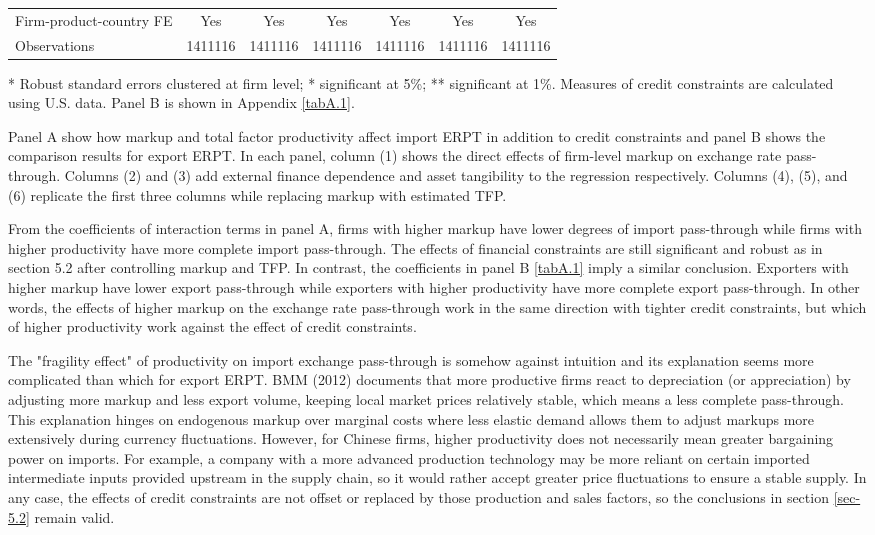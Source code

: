 \begin{table}[htbp]
\begin{threeparttable}
\begin{tabular}{lcccccc}
		Firm-product-country FE & Yes   & Yes   & Yes   & Yes   & Yes   & Yes \\
		Observations & 1411116 & 1411116 & 1411116 & 1411116 & 1411116 & 1411116 \\
		\bottomrule
	\end{tabular}
	\begin{tablenotes}
		\footnotesize
		\item[*] Robust standard errors clustered at firm level; * significant at 5\%; ** significant at 1\%. Measures of credit constraints are calculated using U.S. data. Panel B is shown in Appendix \ref{tabA.1}.
	\end{tablenotes}
	\end{threeparttable}
	\label{tab5.3}
\end{table}

Panel A show how markup and total factor productivity affect import ERPT in addition to credit constraints and panel B shows the comparison results for export ERPT. In each panel, column (1) shows the direct effects of firm-level markup on exchange rate pass-through. Columns (2) and (3) add external finance dependence and asset tangibility to the regression respectively. Columns (4), (5), and (6) replicate the first three columns while replacing markup with estimated TFP. 

From the coefficients of interaction terms in panel A, firms with higher markup have lower degrees of import pass-through while firms with higher productivity have more complete import pass-through. The effects of financial constraints are still significant and robust as in section 5.2 after controlling markup and TFP. In contrast, the coefficients in panel B \ref{tabA.1} imply a similar conclusion. Exporters with higher markup have lower export pass-through while exporters with higher productivity have more complete export pass-through. In other words, the effects of higher markup on the exchange rate pass-through work in the same direction with tighter credit constraints, but which of higher productivity work against the effect of credit constraints.

The "fragility effect" of productivity on import exchange pass-through is somehow against intuition and its explanation seems more complicated than which for export ERPT. BMM (2012)\cite{bmm2012} documents that more productive firms react to depreciation (or appreciation) by adjusting more markup and less export volume, keeping local market prices relatively stable, which means a less complete pass-through. This explanation hinges on endogenous markup over marginal costs where less elastic demand allows them to adjust markups more extensively during currency fluctuations. However, for Chinese firms, higher productivity does not necessarily mean greater bargaining power on imports. For example, a company with a more advanced production technology may be more reliant on certain imported intermediate inputs provided upstream in the supply chain, so it would rather accept greater price fluctuations to ensure a stable supply. In any case, the effects of credit constraints are not offset or replaced by those production and sales factors, so the conclusions in section \ref{sec-5.2} remain valid.

